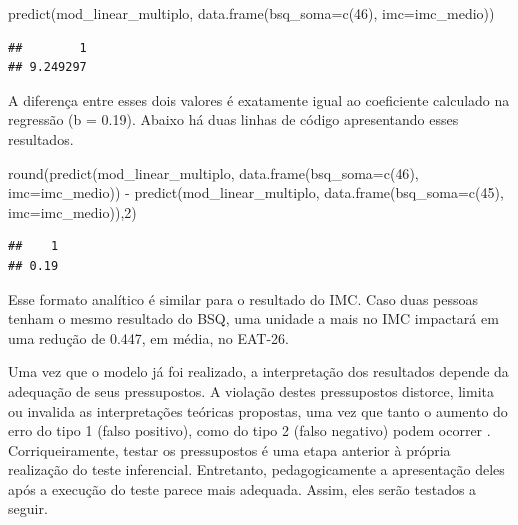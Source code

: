 \documentclass[
]{book}
\newenvironment{Shaded}{\begin{snugshade}}{\end{snugshade}}
\newcommand{\AttributeTok}[1]{\textcolor[rgb]{0.77,0.63,0.00}{#1}}
\newcommand{\DecValTok}[1]{\textcolor[rgb]{0.00,0.00,0.81}{#1}}
\newcommand{\FunctionTok}[1]{\textcolor[rgb]{0.00,0.00,0.00}{#1}}
\newcommand{\NormalTok}[1]{#1}
\newcommand{\SpecialCharTok}[1]{\textcolor[rgb]{0.00,0.00,0.00}{#1}}
\begin{document}
\begin{Shaded}
\begin{Highlighting}[]
\FunctionTok{predict}\NormalTok{(mod\_linear\_multiplo, }\FunctionTok{data.frame}\NormalTok{(}\AttributeTok{bsq\_soma=}\FunctionTok{c}\NormalTok{(}\DecValTok{46}\NormalTok{), }
                                        \AttributeTok{imc=}\NormalTok{imc\_medio))}
\end{Highlighting}
\end{Shaded}

\begin{verbatim}
##        1 
## 9.249297
\end{verbatim}

A diferença entre esses dois valores é exatamente igual ao coeficiente calculado na regressão (b = 0.19). Abaixo há duas linhas de código apresentando esses resultados.

\begin{Shaded}
\begin{Highlighting}[]
\FunctionTok{round}\NormalTok{(}\FunctionTok{predict}\NormalTok{(mod\_linear\_multiplo, }\FunctionTok{data.frame}\NormalTok{(}\AttributeTok{bsq\_soma=}\FunctionTok{c}\NormalTok{(}\DecValTok{46}\NormalTok{), }
                                              \AttributeTok{imc=}\NormalTok{imc\_medio)) }\SpecialCharTok{{-}} 
        \FunctionTok{predict}\NormalTok{(mod\_linear\_multiplo, }\FunctionTok{data.frame}\NormalTok{(}\AttributeTok{bsq\_soma=}\FunctionTok{c}\NormalTok{(}\DecValTok{45}\NormalTok{), }
                                                \AttributeTok{imc=}\NormalTok{imc\_medio)),}\DecValTok{2}\NormalTok{)}
\end{Highlighting}
\end{Shaded}

\begin{verbatim}
##    1 
## 0.19
\end{verbatim}

Esse formato analítico é similar para o resultado do IMC. Caso duas pessoas tenham o mesmo resultado do BSQ, uma unidade a mais no IMC impactará em uma redução de 0.447, em média, no EAT-26.

Uma vez que o modelo já foi realizado, a interpretação dos resultados depende da adequação de seus pressupostos. A violação destes pressupostos distorce, limita ou invalida as interpretações teóricas propostas, uma vez que tanto o aumento do erro do tipo 1 (falso positivo), como do tipo 2 (falso negativo) podem ocorrer \citep{Lix1996, Barker2015, Ernst2017}. Corriqueiramente, testar os pressupostos é uma etapa anterior à própria realização do teste inferencial. Entretanto, pedagogicamente a apresentação deles após a execução do teste parece mais adequada. Assim, eles serão testados a seguir.
\end{document}
